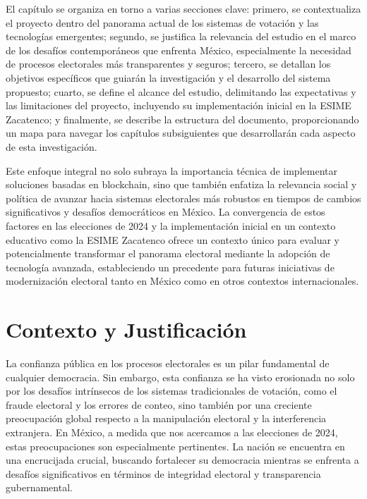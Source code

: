 \documentclass{report}
\begin{document}
	El capítulo se organiza en torno a varias secciones clave: primero, se contextualiza el proyecto dentro del panorama actual de los sistemas de votación y las tecnologías emergentes; segundo, se justifica la relevancia del estudio en el marco de los desafíos contemporáneos que enfrenta México, especialmente la necesidad de procesos electorales más transparentes y seguros; tercero, se detallan los objetivos específicos que guiarán la investigación y el desarrollo del sistema propuesto; cuarto, se define el alcance del estudio, delimitando las expectativas y las limitaciones del proyecto, incluyendo su implementación inicial en la ESIME Zacatenco; y finalmente, se describe la estructura del documento, proporcionando un mapa para navegar los capítulos subsiguientes que desarrollarán cada aspecto de esta investigación.
	
	Este enfoque integral no solo subraya la importancia técnica de implementar soluciones basadas en blockchain, sino que también enfatiza la relevancia social y política de avanzar hacia sistemas electorales más robustos en tiempos de cambios significativos y desafíos democráticos en México. La convergencia de estos factores en las elecciones de 2024 y la implementación inicial en un contexto educativo como la ESIME Zacatenco ofrece un contexto único para evaluar y potencialmente transformar el panorama electoral mediante la adopción de tecnología avanzada, estableciendo un precedente para futuras iniciativas de modernización electoral tanto en México como en otros contextos internacionales.
	
	\section{Contexto y Justificación}
	
	La confianza pública en los procesos electorales es un pilar fundamental de cualquier democracia. Sin embargo, esta confianza se ha visto erosionada no solo por los desafíos intrínsecos de los sistemas tradicionales de votación, como el fraude electoral y los errores de conteo, sino también por una creciente preocupación global respecto a la manipulación electoral y la interferencia extranjera. En México, a medida que nos acercamos a las elecciones de 2024, estas preocupaciones son especialmente pertinentes. La nación se encuentra en una encrucijada crucial, buscando fortalecer su democracia mientras se enfrenta a desafíos significativos en términos de integridad electoral y transparencia gubernamental.
	
\end{document}
